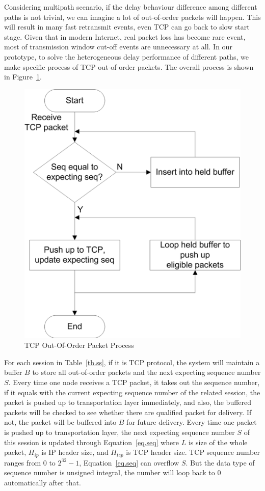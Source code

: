 Considering multipath scenario, if the delay behaviour difference among different paths is not trivial, we can imagine a lot of out-of-order packets will happen. This will result in many fast retransmit events, even TCP can go back to slow start stage. Given that in modern Internet, real packet loss has become rare event, most of transmission window cut-off events are unnecessary at all. In our prototype, to solve the heterogeneous delay performance of different paths, we make specific process of TCP out-of-order packets. The overall process is shown in Figure~\ref{fig.outoforder}.

\begin{figure}
\centering
\includegraphics[width=0.8\linewidth]{fig/outoforder.eps}
\caption{TCP Out-Of-Order Packet Process}
\label{fig.outoforder}
\end{figure}


For each session in Table~\ref{tb.ss}, if it is TCP protocol, the system will maintain a buffer $B$ to store all out-of-order packets and the next expecting sequence number $S$. Every time one node receives a TCP packet, it takes out the sequence number, if it equals with the current expecting sequence number of the related session, the packet is pushed up to transportation layer immediately, and also, the buffered packets will be checked to see whether there are qualified packet for delivery. If not, the packet will be buffered into $B$ for future delivery. Every time one packet is pushed up to transportation layer, the next expecting sequence number $S$ of this session is updated through Equation~\ref{eq.seq} where $L$ is size of the whole packet, $H_{ip}$ is IP header size, and $H_{tcp}$ is TCP header size. TCP sequence number ranges from $0$ to $2^{32}-1$, Equation~\ref{eq.seq} can overflow $S$. But the data type of sequence number is unsigned integral, the number will loop back to $0$ automatically after that. 

